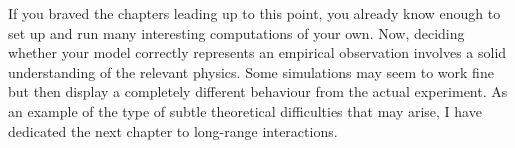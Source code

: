 \bigbreak

If you braved the chapters leading up to this point, you already know enough to 
set up and run many interesting computations of your own. Now, deciding whether 
your model correctly represents an empirical observation involves a solid 
understanding of the relevant physics. Some simulations may seem to work fine 
but then display a completely different behaviour from the actual experiment. As 
an example of the type of subtle theoretical difficulties that may arise, I have 
dedicated the next chapter to long-range interactions.

